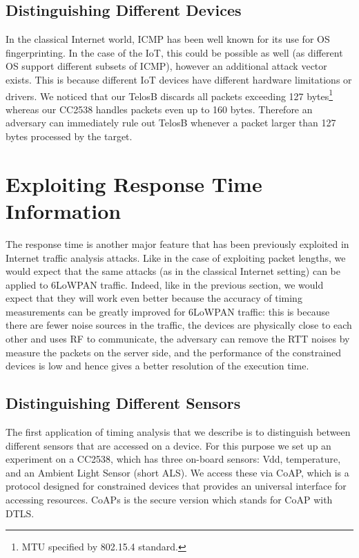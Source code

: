 \documentclass{article}
\begin{document}
\subsection{Distinguishing Different Devices}

In the classical Internet world, ICMP has been well known for its use for OS fingerprinting\cite{OsFingerprint}. In the case of the IoT, this could be possible as well (as different OS support different subsets of ICMP), however an additional attack vector exists. This is because different IoT devices have different hardware limitations or drivers. We noticed that our TelosB\cite{TelosB} discards all packets exceeding 127 bytes\footnote{MTU specified by 802.15.4 standard.} whereas our CC2538 handles packets even up to 160 bytes. Therefore an adversary can immediately rule out TelosB whenever a packet larger than 127 bytes processed by the target.


\section{Exploiting Response Time Information\label{sec: ResponseTime}}

The response time is another major feature that has been previously exploited in Internet traffic analysis attacks. Like in the case of exploiting packet lengths, we would expect that the same attacks (as in the classical Internet setting) can be applied to 6LoWPAN traffic. Indeed, like in the previous section, we would expect that they will work even better because the accuracy of timing measurements can be greatly improved for 6LoWPAN traffic: this is because there are fewer noise sources in the traffic, the devices are physically close to each other and uses RF to communicate, the adversary can remove the RTT noises by measure the packets on the server side, and the performance of the constrained devices is low and hence gives a better resolution of the execution time.

\subsection{Distinguishing Different Sensors}
The first application of timing analysis that we describe is to distinguish between different sensors that are accessed on a device. For this purpose we set up an experiment on a CC2538, which has three on-board sensors: Vdd, temperature, and an Ambient Light Sensor (short ALS). We access these via CoAP\cite{rfc7252}, which is a protocol designed for constrained devices that provides an universal interface for accessing resources. CoAPs is the secure version which stands for CoAP with DTLS.
\end{document}
